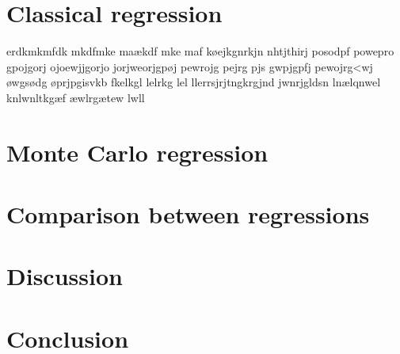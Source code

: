 \documentclass{article}
\begin{document}
	\section{Classical regression}
 	erdkmkmfdk mkdfmke maækdf mke maf  køejkgnrkjn nhtjthirj posodpf powepro gpojgorj ojoewjjgorjo jorjweorjgpøj pewrojg pejrg pjs gwpjgpfj pewojrg<wj  øwgsødg øprjpgisvkb fkelkgl lelrkg lel   llerrsjrjtngkrgjnd jwnrjgldsn  lnælqnwel knlwnltkgæf æwlrgætew lwll
	\newpage
	\section{Monte Carlo regression}
	\newpage
	\section{Comparison between regressions}
	\newpage
	\section{Discussion}
	\newpage
	\section{Conclusion}
	\newpage
 	\Litterature
  
\end{document}
